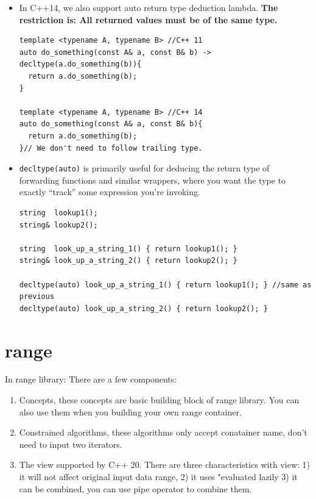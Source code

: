 \documentclass[a4paper,11pt,twoside]{book}
\begin{document}
\begin{itemize}
		\item In C++14, we also support auto return type deduction lambda. \textbf{The restriction is: All returned values must be of the same type.}

\begin{lstlisting}
template <typename A, typename B> //C++ 11
auto do_something(const A& a, const B& b) -> decltype(a.do_something(b)){
  return a.do_something(b);
}

template <typename A, typename B> //C++ 14
auto do_something(const A& a, const B& b){
  return a.do_something(b);
}// We don't need to follow trailing type.
\end{lstlisting}

		\item \texttt{decltype(auto)} is primarily useful for deducing the return type of forwarding functions and similar wrappers, where you want the type to exactly “track” some expression you’re invoking.
\begin{lstlisting}
string  lookup1();
string& lookup2();

string  look_up_a_string_1() { return lookup1(); }
string& look_up_a_string_2() { return lookup2(); }

decltype(auto) look_up_a_string_1() { return lookup1(); } //same as previous 
decltype(auto) look_up_a_string_2() { return lookup2(); }
\end{lstlisting}

\end{itemize}

\section{range}
In range library: There are a few components:
\begin{enumerate}
	\item Concepts, these concepts are basic building block of range library. You can also use them when you building your own range container. 
	\item Constrained algorithms, these algorithms only accept conatainer name, don't need to input two iterators. 
	\item The view supported by C++ 20. There are three characteristics with view: 1) it will not affect original input data range, 2) it uses "evaluated lazily 3) it can be combined, you can use pipe operator to combine them. 
	
\end{enumerate}
\end{document}
